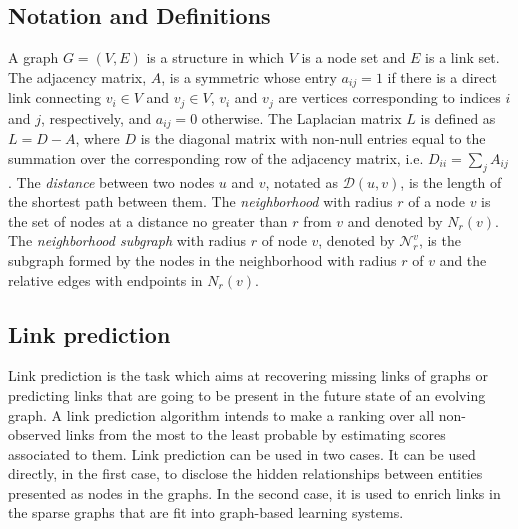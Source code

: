 \documentclass{article}
\begin{document}
\subsection{Notation and Definitions}
A graph $G = (V,E)$ is a structure in which $V$ is a node set and $E$ is a link set. The adjacency matrix, $A$, is a symmetric whose entry $a_{ij} = 1$ if there is a direct link connecting $v_i \in V$ and $v_j \in V$, $v_i$ and $v_j$ are vertices corresponding to indices $i$ and $j$, respectively, and $a_{ij} = 0$ otherwise. The Laplacian matrix $L$ is defined as $L = D-A$, where $D$ is the diagonal matrix with non-null entries equal to the summation over the corresponding row of the adjacency matrix, i.e. $D_{ii}=\sum_jA_{ij}$. The \textit{distance} between two nodes $u$ and $v$, notated as $\mathcal{D}(u,v)$, is the length of the shortest path between them. The \textit{neighborhood} with radius $r$ of a node $v$ is the set of nodes
at a distance no greater than $r$ from $v$ and denoted by $N_r(v)$. The \textit{neighborhood subgraph} with radius $r$ of node $v$, denoted by $\mathcal{N}_{r}^{v}$,  is the subgraph formed by the nodes in the
neighborhood with radius $r$ of $v$ and the relative edges with endpoints in $N_r(v)$.

\subsection{Link prediction}
\label{link-prediction}
Link prediction is the task which aims at recovering missing links of graphs or predicting links that are going to be present in the future state of an evolving graph. A link prediction algorithm intends to make a ranking over all non-observed links from the most to the least probable by estimating scores associated to them. Link prediction can be used in two cases. It can be used directly, in the first case, to disclose the hidden relationships between entities presented as nodes in the graphs. In the second case, it is used to enrich links in the sparse graphs that are fit into graph-based learning systems.
\end{document}
